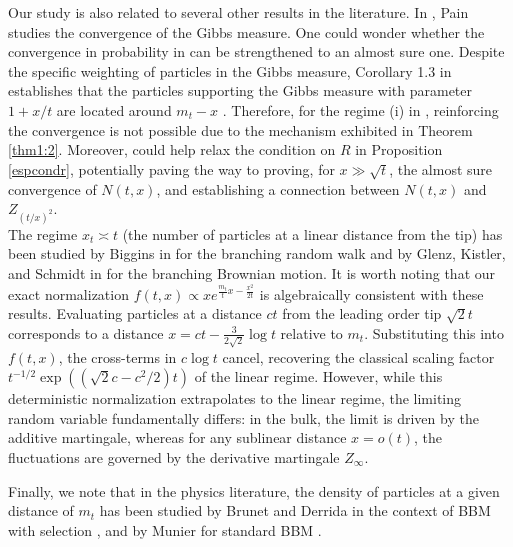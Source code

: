 \documentclass{article}
\begin{document}
Our study is also related to several other results in the literature. In \cite{Pain1}, Pain studies the convergence of the Gibbs measure. One could wonder whether the convergence in probability in \cite[Theorem 1.1]{Pain1} can be strengthened  to an almost sure one. Despite the specific weighting of particles in the Gibbs measure, Corollary 1.3 in \cite{Pain1} establishes that the particles supporting the Gibbs measure with parameter $1+x/t$ are located around $m_t-x$ .  Therefore, for the regime (i) in \cite[Theorem 1.1]{Pain1}, reinforcing the convergence is not possible due to the mechanism exhibited in Theorem \ref{thm1:2}. Moreover, \cite[Theorem 1.1, (iv)]{Pain1} could help relax the condition on $R$ in Proposition \ref{espcondr}, potentially paving the way to proving, for $x\gg\sqrt{t}$, the almost sure convergence of $N(t,x)$, and  establishing a connection between $N(t,x)$ and $Z_{(t/x)^2}$.\\



The regime $x_t \asymp t$ (the number of particles at a linear distance from the tip) has been studied by Biggins in \cite{Biggins} for the branching random walk and by Glenz, Kistler, and Schmidt in \cite{glenz2017mckeans} for the branching Brownian motion. It is worth noting that our exact normalization $f(t,x) \propto x e^{ \frac{m_t}{t}x - \frac{x^2}{2t}}$ is algebraically consistent with these results. Evaluating particles at a distance $ct$ from the leading order tip $\sqrt{2}t$ corresponds to a distance $x = ct - \frac{3}{2\sqrt{2}}\log t$ relative to $m_t$. Substituting this into $f(t,x)$, the cross-terms in $c \log t$ cancel, recovering the classical scaling factor $t^{-1/2} \exp\left( (\sqrt{2}c - c^2/2)t \right)$ of the linear regime. However, while this deterministic normalization extrapolates to the linear regime, the limiting random variable fundamentally differs: in the bulk, the limit is driven by the additive martingale, whereas for any sublinear distance $x = o(t)$, the fluctuations are governed by the derivative martingale $Z_\infty$.

Finally, we note that in the physics literature, the density of particles at a given distance of $m_t$ has been studied by Brunet and Derrida in the context of BBM with selection \cite{PhysRevE.56.2597}, and by Munier for standard BBM \cite{Le_2022}.\\
\end{document}
